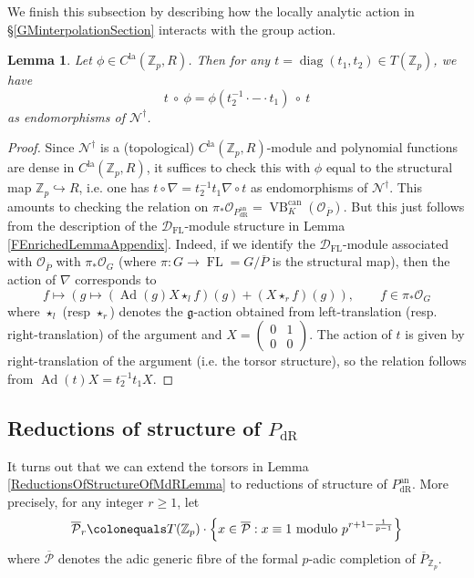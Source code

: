 \documentclass[10pt, oneside]{amsart}
\newcommand{\defeq}{\colonequals}
\numberwithin{equation}{subsection}
\newtheorem{lemma}[equation]{Lemma}
\theoremstyle{definition}
\theoremstyle{remark}
\newcommand{\mbb}[1]{\mathbb{#1}}
\newcommand{\opn}[1]{\operatorname{#1}}
\def\Z{{\mathbb{Z}}}
\begin{document}
We finish this subsection by describing how the locally analytic action in \S \ref{GMinterpolationSection} interacts with the group action.

\begin{lemma} \label{IntertwiningOFGMandZpLemma}
    Let $\phi \in C^{\opn{la}}(\mbb{Z}_p, R)$. Then for any $t = \opn{diag}(t_1, t_2) \in T(\Z_p)$, we have 
    \[
    t ~ \circ ~ \phi = \phi( t_2^{-1} \cdot - \cdot t_1) ~ \circ ~  t
    \]
    as endomorphisms of $\mathscr{N}^{\dagger}$.
\end{lemma}
\begin{proof}
    Since $\mathscr{N}^{\dagger}$ is a (topological) $C^{\opn{la}}(\mbb{Z}_p, R)$-module and polynomial functions are dense in $C^{\opn{la}}(\mbb{Z}_p, R)$, it suffices to check this with $\phi$ equal to the structural map $\mbb{Z}_p \hookrightarrow R$, i.e. one has $t \circ \nabla = t_2^{-1}t_1 \nabla \circ t$ as endomorphisms of $\mathscr{N}^{\dagger}$. This amounts to checking the relation on $\pi_*\mathcal{O}_{P_{\opn{dR}}^{\opn{an}}} = \opn{VB}^{\opn{can}}_{K}(\mathscr{O}_{\overline{P}})$. But this just follows from the description of the $\mathcal{D}_{\opn{FL}}$-module structure in Lemma \ref{FEnrichedLemmaAppendix}. Indeed, if we identify the $\mathcal{D}_{\opn{FL}}$-module associated with $\mathscr{O}_{\overline{P}}$ with $\pi_* \mathcal{O}_G$ (where $\pi \colon G \to \opn{FL} = G/\overline{P}$ is the structural map), then the action of $\nabla$ corresponds to
    \[
    f \mapsto \left( g \mapsto (\opn{Ad}(g)X \star_l f)(g) + (X \star_r f)(g) \right), \quad \quad f \in \pi_* \mathcal{O}_G
    \]
    where $\star_l$ (resp $\star_r$) denotes the $\mathfrak{g}$-action obtained from left-translation (resp. right-translation) of the argument and $X = \left(\begin{smallmatrix} 0 & 1 \\ 0 & 0 \end{smallmatrix}\right)$. The action of $t$ is given by right-translation of the argument (i.e. the torsor structure), so the relation follows from $\opn{Ad}(t)X = t_2^{-1}t_1 X$.
\end{proof}

\subsection{Reductions of structure of \texorpdfstring{$P_{\opn{dR}}$}{PdR}}

It turns out that we can extend the torsors in Lemma \ref{ReductionsOfStructureOfMdRLemma} to reductions of structure of $P_{\opn{dR}}^{\opn{an}}$. More precisely, for any integer $r \geq 1$, let 
\[
\overline{\mathcal{P}}_r \defeq T(\mbb{Z}_p) \cdot \left\{ x \in \overline{\mathcal{P}} : x \equiv 1 \text{ modulo } p^{r+1 - \frac{1}{p-1}} \right\}
\]
where $\overline{\mathcal{P}}$ denotes the adic generic fibre of the formal $p$-adic completion of $\overline{P}_{\mbb{Z}_p}$.
\end{document}
